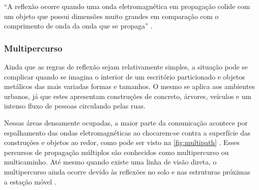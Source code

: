 ``A reflexão ocorre quando uma onda eletromagnética em propagação colide com um objeto que possui dimensões muito grandes em comparação com o comprimento de onda da onda que se propaga'' \cite[p.~76]{rappaport2009}.

\begin{figure}[H]
	\centering
\end{figure}

\subsubsection{Multipercurso}
\label{subsec:multipercurso}

Ainda que as regras de reflexão sejam relativamente simples, a situação pode se complicar quando se imagina o interior de um escritório particionado e objetos metálicos das mais variadas formas e tamanhos. O mesmo se aplica aos ambientes urbanos, já que estes apresentam construções de concreto, árvores, veículos e um intenso fluxo de pessoas circulando pelas ruas.

Nessas áreas densamente ocupadas, a maior parte da comunicação acontece por espalhamento das ondas eletromagnéticas ao chocarem-se contra a superfície das construções e objetos ao redor, como pode ser visto na \autoref{fig:multipath} \cite{haykin2008}.  Esses percursos de propagação múltiplos são conhecidos como multipercurso ou multicaminho. Até mesmo quando existe uma linha de visão direta, o multipercurso ainda ocorre devido às reflexões no solo e nas estruturas próximas a estação móvel \cite{rappaport2009}.


